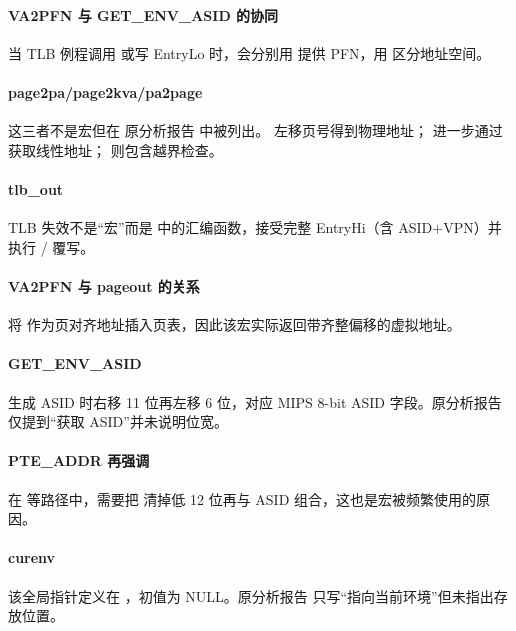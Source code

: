 \documentclass[12pt,oneside]{ctexbook}
\begin{document}
\paragraph{VA2PFN 与 GET\_ENV\_ASID 的协同}
当 TLB 例程调用  或写 EntryLo 时，会分别用  提供 PFN，用  区分地址空间。

\paragraph{page2pa/page2kva/pa2page}
这三者不是宏但在 原分析报告 中被列出。 左移页号得到物理地址； 进一步通过  获取线性地址； 则包含越界检查。

\paragraph{tlb\_out}
TLB 失效不是“宏”而是  中的汇编函数，接受完整 EntryHi（含 ASID+VPN）并执行 / 覆写。

\paragraph{VA2PFN 与 pageout 的关系}
 将  作为页对齐地址插入页表，因此该宏实际返回带齐整偏移的虚拟地址。

\paragraph{GET\_ENV\_ASID}
生成 ASID 时右移 11 位再左移 6 位，对应 MIPS 8-bit ASID 字段。原分析报告 仅提到“获取 ASID”并未说明位宽。

\paragraph{PTE\_ADDR 再强调}
在  等路径中，需要把  清掉低 12 位再与 ASID 组合，这也是宏被频繁使用的原因。

\paragraph{curenv}
该全局指针定义在 ，初值为 NULL。原分析报告 只写“指向当前环境”但未指出存放位置。
\end{document}
